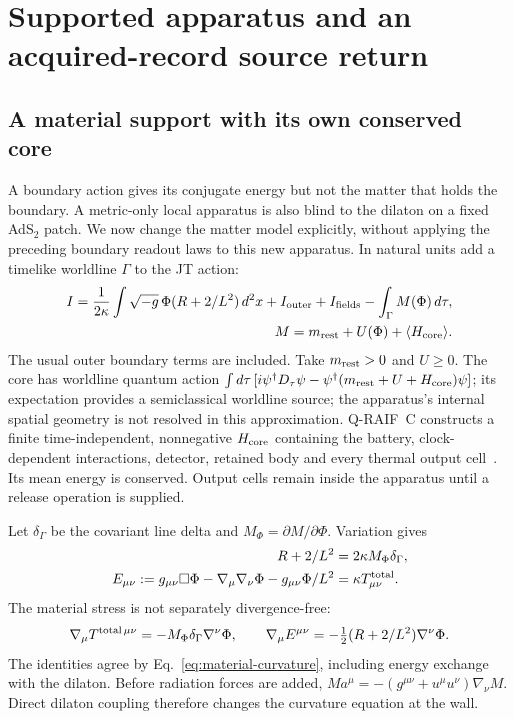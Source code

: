 \documentclass[12pt,a4paper]{article}
\begin{document}
\section{Supported apparatus and an acquired-record source return}
\label{app:material-return}

\subsection{A material support with its own conserved core}
\label{sec:material-support}

A boundary action gives its conjugate energy but not the matter that holds
the boundary. A metric-only local apparatus is also blind to the dilaton
on a fixed AdS$_2$ patch. We now change the matter model explicitly,
without applying the preceding boundary readout laws to this new apparatus.
In natural units add a timelike worldline $\Gamma$ to the JT action:
\begin{align}\label{eq:material-action}
 I=\frac1{2\kappa}\int\sqrt{-g}\,\Phi(R+2/L^2)\,d^2x
       +I_{\rm outer}+I_{\rm fields}-\int_\Gamma M(\Phi)\,d\tau,&\nonumber\\
 M=m_{\rm rest}+U(\Phi)+\langle H_{\rm core}\rangle.&
\end{align}
The usual outer boundary terms are included. Take $m_{\rm rest}>0$ and
$U\ge0$. The core has worldline quantum action
$\int d\tau\,[i\psi^\dagger D_\tau\psi-
\psi^\dagger(m_{\rm rest}+U+H_{\rm core})\psi]$; its expectation
provides a semiclassical worldline source; the apparatus's internal spatial
geometry is not resolved in this approximation. Q-RAIF~C constructs a finite
time-independent, nonnegative $H_{\rm core}$ containing the battery,
clock-dependent interactions, detector, retained body and every thermal
output cell~\cite{QRC}. Its mean energy is conserved. Output cells remain
inside the apparatus until a release operation is supplied.

Let $\delta_\Gamma$ be the covariant line delta and
$M_\Phi=\partial M/\partial\Phi$. Variation gives
\begin{align}
 R+2/L^2&=2\kappa M_\Phi\delta_\Gamma,
       \label{eq:material-curvature}\\
 E_{\mu\nu}:=g_{\mu\nu}\Box\Phi-\nabla_\mu\nabla_\nu\Phi
                     -g_{\mu\nu}\Phi/L^2
       &=\kappa T^{\rm total}_{\mu\nu}.
       \label{eq:material-metric}
\end{align}
The material stress is not separately divergence-free:
\begin{equation}\label{eq:material-ward}
 \nabla_\mu T^{{\rm total}\,\mu\nu}
       =-M_\Phi\delta_\Gamma\nabla^\nu\Phi,
 \qquad
 \nabla_\mu E^{\mu\nu}
       =-\tfrac12(R+2/L^2)\nabla^\nu\Phi.
\end{equation}
The identities agree by Eq.~\eqref{eq:material-curvature}, including
energy exchange with the dilaton. Before radiation forces are added,
$M a^\mu=-(g^{\mu\nu}+u^\mu u^\nu)\nabla_\nu M$.
Direct dilaton coupling therefore changes the curvature equation at the wall.
\end{document}
